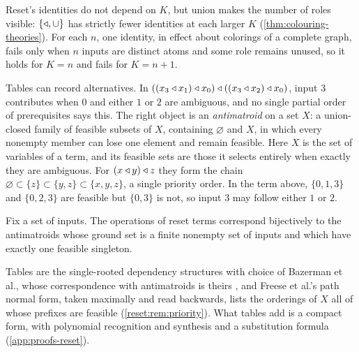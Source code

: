 Reset's identities do not depend on $K$, but union makes the number of roles visible: $\{\mathbin{\triangleleft},\cup\}$ has strictly fewer identities at each larger $K$ (\cref{thm:colouring-theories}). For each $n$, one identity, in effect about colorings of a complete graph, fails only when $n$ inputs are distinct atoms and some role remains unused, so it holds for $K=n$ and fails for $K=n+1$.

Tables can record alternatives. In $((x_3\mathbin{\triangleleft} x_1)\mathbin{\triangleleft} x_0)\mathbin{\triangleleft}((x_3\mathbin{\triangleleft} x_2)\mathbin{\triangleleft} x_0)$, input $3$ contributes when $0$ and either $1$ or $2$ are ambiguous, and no single partial order of prerequisites says this. The right object is an \emph{antimatroid} on a set $X$: a union-closed family of feasible subsets of $X$, containing $\varnothing$
and $X$, in which every nonempty member can lose one element and remain feasible. Here $X$ is the set of variables of a term, and its feasible sets are those it selects entirely when exactly they are ambiguous. For $(x\mathbin{\triangleleft} y)\mathbin{\triangleleft} z$ they form the chain $\varnothing\subset\{z\}\subset\{y,z\}\subset\{x,y,z\}$, a single priority order. In the term above, $\{0,1,3\}$ and $\{0,2,3\}$ are feasible but $\{0,3\}$ is not, so input $3$ may follow either $1$ or $2$.

\begin{theorem}\label{reset:thm:anti}
Fix a set of inputs. The operations of reset terms correspond bijectively to the antimatroids whose ground set is a finite nonempty set of inputs and which have exactly one feasible singleton.
\end{theorem}

Tables are the single-rooted dependency structures with choice of Bazerman et al., whose correspondence with antimatroids is theirs \cite{BazermanMinichielloPuzio2023}, and Freese et al.'s path normal form, taken maximally and read backwards, lists the orderings of $X$ all of whose prefixes are feasible (\cref{reset:rem:priority}). What tables add is a compact form, with polynomial recognition and synthesis and a substitution formula (\cref{app:proofs-reset}).
